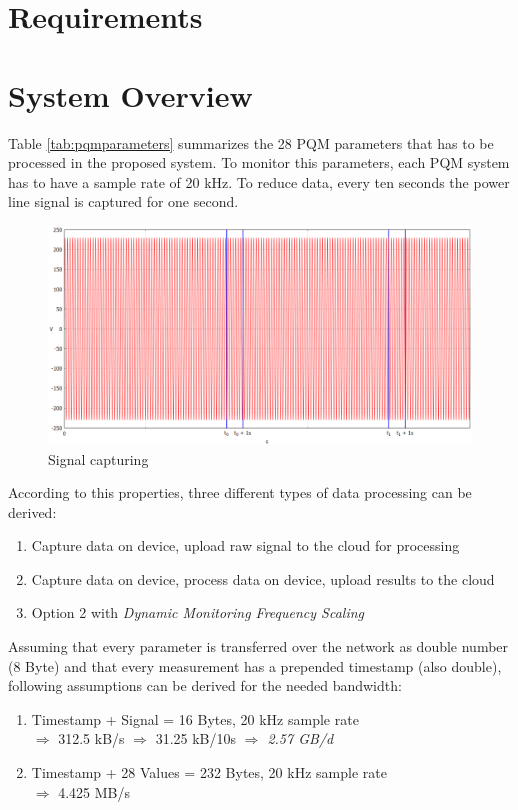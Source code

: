 \section{Requirements}

\section{System Overview}
Table \ref{tab:pqmparameters} summarizes the 28 PQM parameters that has to be processed in the proposed system. To monitor this parameters, each PQM system has to have a sample rate of 20 kHz. To reduce data, every ten seconds the power line signal is captured for one second.

\begin{figure}[h]
	\centering
		\includegraphics[scale=0.45]{graphics/sysdesign.eps}
	\caption{Signal capturing}
	\label{fig:sysdesign}
\end{figure}


According to this properties, three different types of data processing can be derived:

\begin{enumerate}
	\item Capture data on device, upload raw signal to the cloud for processing
	\item Capture data on device, process data on device, upload results to the cloud
	\item Option 2 with \textit{Dynamic Monitoring Frequency Scaling}
\end{enumerate}

Assuming that every parameter is transferred over the network as double number (8 Byte) and that every measurement has a prepended timestamp (also double), following assumptions can be derived for the needed bandwidth:

\begin{enumerate}
	\item Timestamp + Signal = 16 Bytes, 20 kHz sample rate \\ $\Rightarrow$ 312.5 kB/s $\Rightarrow$ 31.25 kB/10s \textit{$\Rightarrow$ 2.57 GB/d}
	\item Timestamp + 28 Values = 232 Bytes, 20 kHz sample rate \\ $\Rightarrow$ 4.425 MB/s
\end{enumerate}


